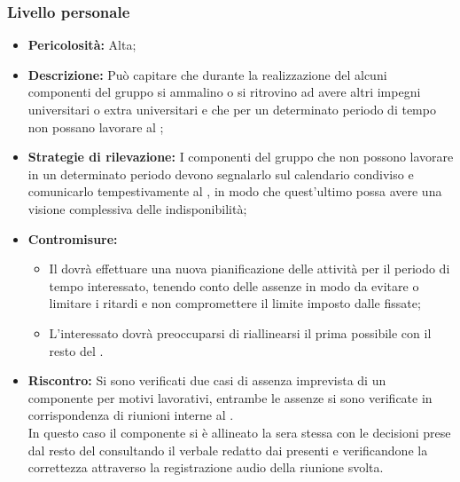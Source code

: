 \subsubsection{Livello personale}\label{lp}
\label{r_comp}
\begin{itemize}
\item \textbf{Pericolosità:} Alta;
\item \textbf{Descrizione:} Può capitare che durante la realizzazione del  alcuni componenti del gruppo si ammalino o si ritrovino ad avere altri impegni universitari o extra universitari e che per un determinato periodo di tempo non possano lavorare al ;
\item \textbf{Strategie di rilevazione:} I componenti del gruppo che non possono lavorare in un determinato periodo devono segnalarlo sul calendario condiviso e comunicarlo tempestivamente al \rRP, in modo che quest'ultimo possa avere una visione complessiva delle indisponibilità;
\item \textbf{Contromisure:}
\begin{itemize}
\item Il \rRP dovrà effettuare una nuova pianificazione delle attività per il periodo di tempo interessato, tenendo conto delle assenze in modo da evitare o limitare i ritardi e non compromettere il limite imposto dalle  fissate;
\item L'interessato dovrà preoccuparsi di riallinearsi il prima possibile con il resto del .
\end{itemize}
\item \textbf{Riscontro:}
Si sono verificati due casi di assenza imprevista di un componente per motivi lavorativi, entrambe le assenze si sono verificate in corrispondenza di riunioni interne al . \\ In questo caso il componente si è allineato la sera stessa con le decisioni prese  dal resto del  consultando il verbale redatto dai presenti e verificandone la correttezza attraverso la registrazione audio della riunione svolta.
\end{itemize}
\label{r_liti}
